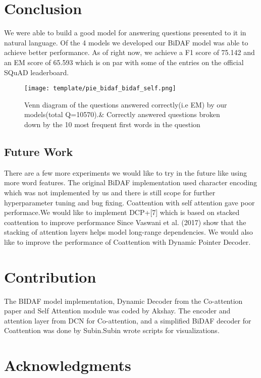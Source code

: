 \documentclass{article} %
\begin{document}
 

\section{Conclusion}

We were able to build a good model for answering questions presented to it in natural language. Of the 4 models we developed our BiDAF model was able to achieve better performance.
As of right now, we achieve a F1 score of 75.142 and an EM score of 65.593 which is on par with some of the entries on the official SQuAD leaderboard.

\begin{figure}
\texttt{[image: template/pie\_bidaf\_bidaf\_self.png]}
\centering
\caption{Venn diagram of the questions answered correctly(i.e EM) by our models(total Q=10570).\& Correctly answered questions broken down by the 10 most frequent first words in the question}
\end{figure}

\subsection*{Future Work}

There are a few more experiments we would like to try in the future like using more word features.
The original BiDAF implementation used character encoding which was not implemented by us and there is still scope for further hyperparameter tuning and bug fixing.
Coattention with self attention gave poor performace.We would like to implement DCP+[7] which is based on stacked coattention to improve performance Since Vaswani et al. (2017) show that the stacking of attention layers helps model long-range dependencies. We would also like to improve the performance of Coattention with Dynamic Pointer Decoder.




\section{Contribution}
The BIDAF model implementation, Dynamic Decoder from the Co-attention paper and Self Attention module was coded by Akshay.
The encoder and attention layer from DCN for Co-attention, and a simplified BiDAF decoder for Coattention was done by Subin.Subin wrote scripts for visualizations.

\section{Acknowledgments}
\end{document}
